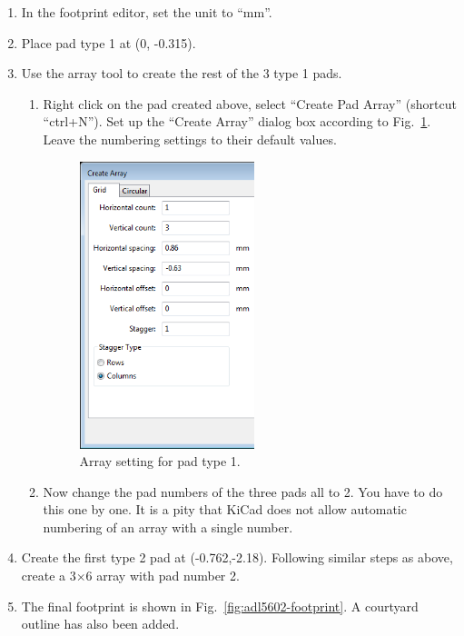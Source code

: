 \documentclass[12pt,letterpaper]{scrartcl}
\begin{document}
\begin{enumerate}
	\item In the footprint editor, set the unit to ``mm''.
	\item Place pad type 1 at (0, -0.315). 
	\item Use the array tool to create the rest of the 3 type 1 pads. 	
		\begin{enumerate}
			\item Right click on the pad created above, select ``Create Pad Array'' (shortcut ``ctrl+N''). Set up the ``Create Array'' dialog box according to Fig.~\ref{fig:pad-array-1}. Leave the numbering settings to their default values.
			
			\begin{figure}[ph]
				\centering
				\includegraphics[width=2in]{pad-array-1}
				\caption{Array setting for pad type 1.}
				\label{fig:pad-array-1}
			\end{figure}
			
			\item Now change the pad numbers of the three pads all to 2. You have to do this one by one. It is a pity that KiCad does not allow automatic numbering of an array with a single number. 
			 
		\end{enumerate}
	\item Create the first type 2 pad at (-0.762,-2.18). Following similar steps as above, create a 3$\times$6 array with pad number 2.
	
	\item The final footprint is shown in Fig.~\ref{fig:adl5602-footprint}. A courtyard outline has also been added. 
				

\end{enumerate}
\end{document}

